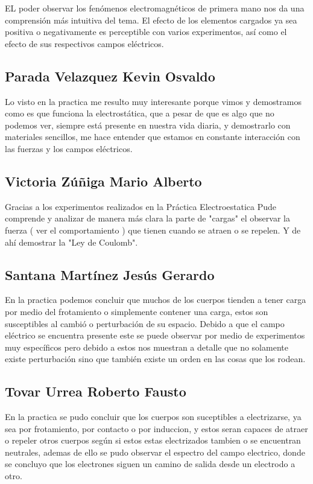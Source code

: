 \documentclass[11pt]{article}
\begin{document}
\begin{multicols}{2}
EL poder observar los fenómenos electromagnéticos de primera mano nos da una comprensión más intuitiva del tema. El efecto de los elementos cargados ya sea positiva o negativamente es perceptible con varios experimentos, así como el efecto de sus respectivos campos eléctricos.

\subsection{Parada Velazquez Kevin Osvaldo}

Lo visto en la practica me resulto muy interesante porque vimos y demostramos como es que funciona la electrostática, que a pesar de que es algo que no podemos ver, siempre está presente en nuestra vida diaria, y demostrarlo con materiales sencillos, me hace entender que estamos en constante interacción con las fuerzas y los campos eléctricos.

\subsection{Victoria Zúñiga Mario Alberto}

Gracias a los experimentos realizados  en la Práctica  Electroestatica
Pude comprende y analizar de manera más clara la parte de "cargas" el observar la fuerza ( ver el comportamiento ) que tienen cuando se atraen o se repelen. Y de ahí  demostrar  la "Ley de Coulomb".

\subsection{Santana Martínez Jesús Gerardo}

En la practica podemos concluir que muchos de los cuerpos tienden a tener carga por medio del frotamiento o simplemente contener una carga, estos son susceptibles al cambió o perturbación de su espacio.
Debido a que el campo eléctrico se encuentra presente este se puede observar por medio de experimentos muy específicos pero debido a estos nos muestran a detalle que no solamente existe perturbación sino que también existe un orden en las cosas que los rodean.

\subsection{Tovar Urrea Roberto Fausto}

En la practica se pudo concluir que los cuerpos son suceptibles a electrizarse, ya sea por frotamiento, por contacto o por induccion, y estos seran capaces de atraer o repeler otros cuerpos según si estos estas electrizados tambien o se encuentran neutrales, ademas de ello se pudo observar el espectro del campo electrico, donde se concluyo que los electrones siguen un camino de salida desde un electrodo a otro.


\end{multicols}
\end{document}
